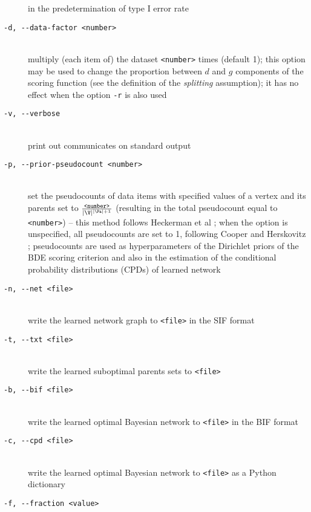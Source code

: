 \begin{description}
 in the predetermination of type I error rate
\item[\texttt{-d, -\hspace{0pt}-data-factor <number>}]~\\
 multiply (each item of) the dataset \texttt{<number>} times (default 1); 
 this option may be used to change the proportion between $d$ and $g$ components 
 of the scoring function (see the definition of the \emph{splitting} assumption);
 it has no effect when the option \texttt{-r} is also used
\item[\texttt{-v, -\hspace{0pt}-verbose}]~\\
 print out communicates on standard output %
\item[\texttt{-p, -\hspace{0pt}-prior-pseudocount <number>}]~\\
 set the pseudocounts of data items with specified values of a vertex and its parents set 
 to $\frac{\texttt{<number>}}{|\V|^{|\Pa|+1}}$ 
 (resulting in the total pseudocount equal to \texttt{<number>}) 
 -- this method follows Heckerman et al \cite{heckerman95}; 
 when the option is unspecified, all pseudocounts are set to 1, 
 following Cooper and Herskovitz \cite{cooper92}; 
 pseudocounts are used as hyperparameters of the Dirichlet priors 
 of the BDE scoring criterion and also in the estimation 
 of the conditional probability distributions (CPDs) of learned network
\item[\texttt{-n, -\hspace{0pt}-net <file>}]~\\
 write the learned network graph to \texttt{<file>} in the SIF format
\item[\texttt{-t, -\hspace{0pt}-txt <file>}]~\\
 write the learned suboptimal parents sets to \texttt{<file>}
\item[\texttt{-b, -\hspace{0pt}-bif <file>}]~\\
 write the learned optimal Bayesian network to \texttt{<file>} 
 in the BIF format
 \item[\texttt{-c, -\hspace{0pt}-cpd <file>}]~\\
  write the learned optimal Bayesian network to \texttt{<file>} 
  as a Python dictionary 
\item[\texttt{-f, -\hspace{0pt}-fraction <value>}]~\\

\end{description}
